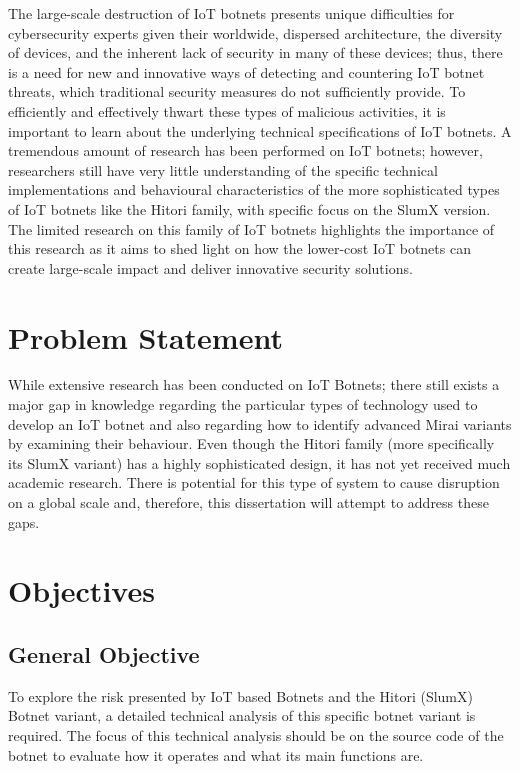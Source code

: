 \documentclass[12pt,letterpaper]{report}
\begin{document}
The large-scale destruction of IoT botnets presents unique difficulties for cybersecurity experts given their worldwide, dispersed architecture, the diversity of devices, and the inherent lack of security in many of these devices; thus, there is a need for new and innovative ways of detecting and countering IoT botnet threats, which traditional security measures do not sufficiently provide. To efficiently and effectively thwart these types of malicious activities, it is important to learn about the underlying technical specifications of IoT botnets\cite{bertino2016botnets}. A tremendous amount of research has been performed on IoT botnets; however, researchers still have very little understanding of the specific technical implementations and behavioural characteristics of the more sophisticated types of IoT botnets like the Hitori family, with specific focus on the SlumX version. The limited research on this family of IoT botnets highlights the importance of this research as it aims to shed light on how the lower-cost IoT botnets can create large-scale impact and deliver innovative security solutions.

\section{Problem Statement}

While extensive research has been conducted on IoT Botnets; there still exists a major gap in knowledge regarding the particular types of technology used to develop an IoT botnet and also regarding how to identify advanced Mirai variants by examining their behaviour. Even though the Hitori family (more specifically its SlumX variant) has a highly sophisticated design, it has not yet received much academic research. There is potential for this type of system to cause disruption on a global scale and, therefore, this dissertation will attempt to address these gaps.

\section{Objectives}

\subsection{General Objective}

To explore the risk presented by IoT based Botnets and the Hitori (SlumX) Botnet variant, a detailed technical analysis of this specific botnet variant is required. The focus of this technical analysis should be on the source code of the botnet to evaluate how it operates and what its main functions are.
\end{document}
